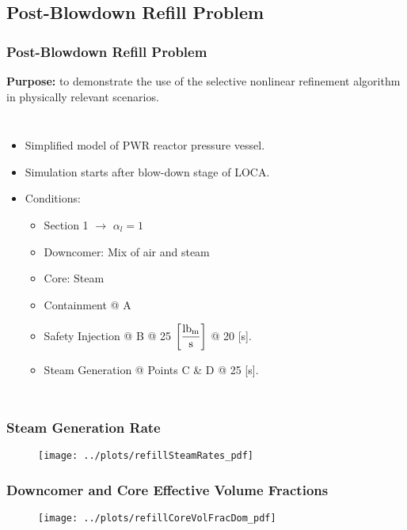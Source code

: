\documentclass[compress,xcolor=table]{beamer}
\begin{document}
\subsection[Post-Blowdown Refill Problem]{Post-Blowdown Refill Problem}
\begin{frame}[shrink=5]
\frametitle{Post-Blowdown Refill Problem}

\textbf{Purpose:} to demonstrate the use of the selective nonlinear refinement algorithm in physically relevant scenarios.

\begin{columns}
\begin{itemize}
\item{Simplified model of PWR reactor pressure vessel.}
\item{Simulation starts after blow-down stage of LOCA.}
\item{Conditions:
\begin{itemize}
\item{Section 1 $\rightarrow$ $\alpha_{l} = 1$}
\item{Downcomer: Mix of air and steam}
\item{Core: Steam}
\item{Containment @ A}
\item{Safety Injection @ B @ 25 $\displaystyle \left[ \frac{\lbm{}}{\text{s}} \right]$ @ 20 [s].}
\item{Steam Generation @ Points C \& D @ 25 [s].}
\end{itemize}
}
\end{itemize}


\begin{figure}[h!t]
\centering
\resizebox{!}{0.65\textheight}{}
\end{figure}
\end{columns}

\end{frame}
\begin{frame}
\frametitle{Steam Generation Rate}

\begin{figure}[h!t]
\centering
\texttt{[image: ../plots/refillSteamRates\_pdf]}
\end{figure}

\end{frame}
\begin{frame}
\frametitle{Downcomer and Core Effective Volume Fractions}

\begin{figure}[h!t]
\centering
\texttt{[image: ../plots/refillCoreVolFracDom\_pdf]}
\end{figure}

\end{frame}
\end{document}
